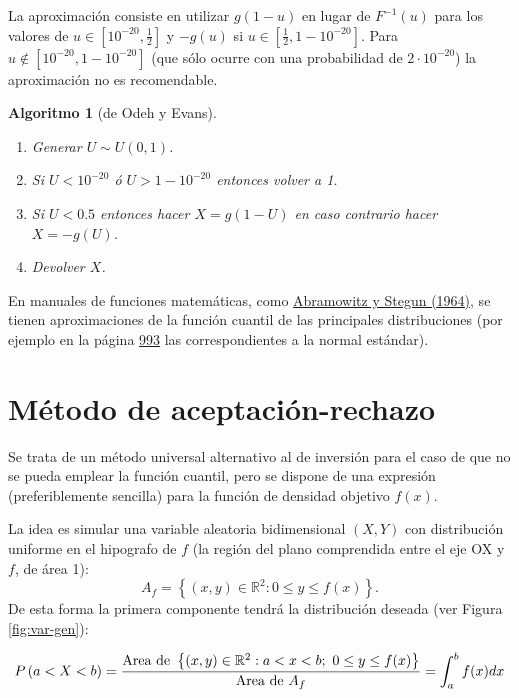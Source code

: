 \documentclass[
  spanish,
  10pt,
]{book}
\theoremstyle{break}
\newtheorem{conjecture}{Algoritmo}[chapter]
\theoremstyle{nonumberplain}
\begin{document}
La aproximación consiste en utilizar \(g\left( 1-u\right)\) en lugar de \(F^{-1}\left( u\right)\) para los valores de \(u\in[10^{-20},\frac12]\) y \(-g\left( u\right)\) si \(u\in[\frac12,1-10^{-20}]\).
Para \(u \notin [10^{-20},1-10^{-20}]\) (que sólo ocurre con una probabilidad de \(2\cdot10^{-20}\)) la aproximación no es recomendable.

\begin{conjecture}[de Odeh y Evans]
\protect\hypertarget{cnj:Odeh-Evans}{}\label{cnj:Odeh-Evans}

\begin{enumerate}
\def\labelenumi{\arabic{enumi}.}
\item
  Generar \(U \sim U(0, 1)\).
\item
  Si \(U<10^{-20}\) ó \(U>1-10^{-20}\) entonces volver a 1.
\item
  Si \(U<0.5\) entonces hacer \(X=g\left(1-U\right)\)
  en caso contrario hacer \(X=-g\left( U\right)\).
\item
  Devolver \(X\).
\end{enumerate}

\end{conjecture}

En manuales de funciones matemáticas, como \href{https://www.math.ubc.ca/~cbm/aands/frameindex.htm}{Abramowitz y Stegun (1964)}, se tienen aproximaciones de la función cuantil de las principales distribuciones (por ejemplo en la página \href{https://www.math.ubc.ca/~cbm/aands/page_933.htm}{993} las correspondientes a la normal estándar).

\section{Método de aceptación-rechazo}\label{AR}

Se trata de un método universal alternativo al de inversión para el caso de que no se pueda emplear la función cuantil, pero se dispone de una expresión (preferiblemente sencilla) para la función de densidad objetivo \(f\left( x \right)\).

La idea es simular una variable aleatoria bidimensional \(\left( X, Y\right)\) con distribución uniforme en el hipografo de \(f\) (la región del plano comprendida entre el eje OX y \(f\), de área 1):
\[A_{f}=\left\{ \left( x,y\right) \in \mathbb{R}^{2}:0\leq y\leq f(x) \right\}.\]
De esta forma la primera componente tendrá la distribución deseada (ver Figura \ref{fig:var-gen}):

\[ P\left( a<X<b\right) = \frac{\text{Area de }\left\{ \left( x,y\right) \in 
\mathbb{R}^{2}:a<x<b;~0\leq y\leq f(x) \right\} }{\text{Area de }
A_{f}} \\
= \int_{a}^{b}f(x) dx \]
\end{document}
